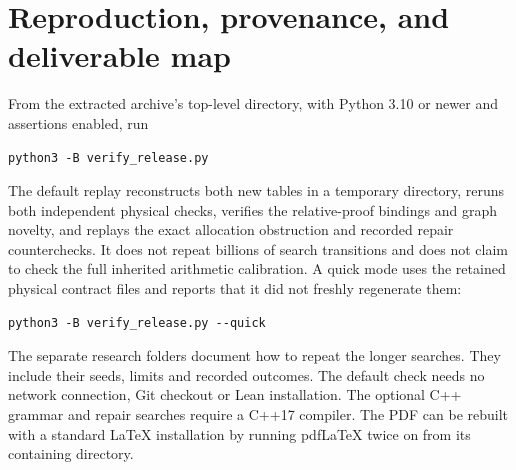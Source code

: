 \documentclass[11pt,a4paper]{article}
\begin{document}
\section{Reproduction, provenance, and deliverable map}

From the extracted archive's top-level directory, with Python 3.10 or
newer and assertions enabled, run
\begin{verbatim}
python3 -B verify_release.py
\end{verbatim}
The default replay reconstructs both new tables in a temporary directory,
reruns both independent physical checks, verifies the relative-proof
bindings and graph novelty, and replays the exact allocation obstruction
and recorded repair counterchecks. It does not repeat billions of search
transitions and does not claim to check the full inherited arithmetic
calibration. A quick mode uses the retained physical contract files and
reports that it did not freshly regenerate them:
\begin{verbatim}
python3 -B verify_release.py --quick
\end{verbatim}
The separate research folders document how to repeat the longer searches.
They include their seeds, limits and recorded outcomes. The default check
needs no network connection, Git checkout or Lean installation. The optional
C++ grammar and repair searches require a C++17 compiler. The PDF can be
rebuilt with a standard LaTeX installation by running pdfLaTeX twice on
 from its containing directory.
\end{document}
